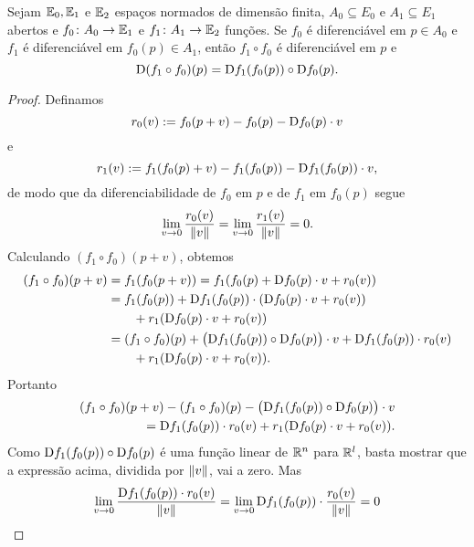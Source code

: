 \begin{proposition}
Sejam $\mathbb{E}_0, \mathbb{E}_1$ e $\mathbb{E}_2$ espaços normados de dimensão finita, $A_0 \subseteq E_0$ e $A_1 \subseteq E_1$ abertos e $f_0\colon A_0 \to \mathbb{E}_1$ e $f_1\colon A_1 \to \mathbb{E}_2$ funções. Se $f_0$ é diferenciável em $p \in A_0$ e $f_1$ é diferenciável em $f_0(p) \in A_1$, então $f_1 \circ f_0$ é diferenciável em $p$ e
	\begin{equation*}
	\mathrm{D} (f_1 \circ f_0)(p) = \mathrm{D} f_1(f_0(p)) \circ \mathrm{D} f_0(p).
	\end{equation*}
\end{proposition}
\begin{proof} Definamos
	\begin{equation*}
	r_0(v) := f_0(p+v) - f_0(p) - \mathrm{D} f_0(p) \cdot v
	\end{equation*}
e
	\begin{equation*}
	r_1(v) := f_1(f_0(p)+v) - f_1(f_0(p)) - \mathrm{D} f_1(f_0(p)) \cdot v,
	\end{equation*}
de modo que da diferenciabilidade de $f_0$ em $p$ e de $f_1$ em $f_0(p)$ segue
	\begin{equation*}
	\lim_{v \rightarrow 0} \frac{r_0(v)}{\left\Vert{v}\right\Vert} = \lim_{v \rightarrow 0} \frac{r_1(v)}{\left\Vert{v}\right\Vert} = 0.
	\end{equation*}	
Calculando $(f_1 \circ f_0)(p+v)$, obtemos
	\begin{align*}
	(f_1 \circ f_0)(p+v) &= f_1(f_0(p+v)) = f_1(f_0(p)+\mathrm{D} f_0(p) \cdot v + r_0(v)) \\
		&= f_1(f_0(p)) + \mathrm{D} f_1(f_0(p)) \cdot (\mathrm{D} f_0(p) \cdot v + r_0(v)) \\
		&\qquad + r_1(\mathrm{D} f_0(p) \cdot v + r_0(v)) \\
		&= (f_1 \circ f_0)(p) + \big(\mathrm{D} f_1(f_0(p)) \circ \mathrm{D} f_0(p)\big) \cdot v + \mathrm{D} f_1(f_0(p)) \cdot r_0(v) \\
		&\qquad + r_1(\mathrm{D} f_0(p) \cdot v + r_0(v)).
	\end{align*}
Portanto
	\begin{align*}
	(f_1 \circ f_0)(p+v) - (f_1 \circ f_0)(p) - \big(\mathrm{D} f_1(f_0(p)) \circ \mathrm{D} f_0(p)\big) \cdot v \\
	\qquad = \mathrm{D} f_1(f_0(p)) \cdot r_0(v) + r_1(\mathrm{D} f_0(p) \cdot v + r_0(v)).
	\end{align*}
Como $\mathrm{D} f_1(f_0(p)) \circ \mathrm{D} f_0(p)$ é uma função linear de $\mathbb{R}^n$ para $\mathbb{R}^l$, basta mostrar que a expressão acima, dividida por $\left\Vert{v}\right\Vert$, vai a zero. Mas
	\begin{equation*}
	\lim_{v \conv 0} \frac{\D f_1(f_0(p)) \cdot r_0(v)}{\nor{v}} = \lim_{v \conv 0} \D f_1(f_0(p)) \cdot \frac{r_0(v)}{\nor{v}} = 0

\end{equation*}
\end{proof}
